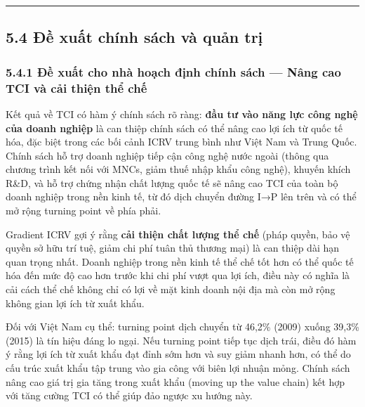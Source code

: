 \documentclass[12pt,a4paper]{article}
\begin{document}
\begin{center}\rule{0.5\linewidth}{0.5pt}\end{center}

\hypertarget{54-ux111ux1ec1-xuux1ea5t-chuxednh-suxe1ch-vuxe0-quux1ea3n-trux1ecb}{%
\subsection{5.4 Đề xuất chính sách và quản
trị}\label{54-ux111ux1ec1-xuux1ea5t-chuxednh-suxe1ch-vuxe0-quux1ea3n-trux1ecb}}

\hypertarget{541-ux111ux1ec1-xuux1ea5t-cho-nhuxe0-houx1ea1ch-ux111ux1ecbnh-chuxednh-suxe1ch--nuxe2ng-cao-tci-vuxe0-cux1ea3i-thiux1ec7n-thux1ec3-chux1ebf}{%
\subsubsection{5.4.1 Đề xuất cho nhà hoạch định chính sách --- Nâng cao
TCI và cải thiện thể
chế}\label{541-ux111ux1ec1-xuux1ea5t-cho-nhuxe0-houx1ea1ch-ux111ux1ecbnh-chuxednh-suxe1ch--nuxe2ng-cao-tci-vuxe0-cux1ea3i-thiux1ec7n-thux1ec3-chux1ebf}}

Kết quả về TCI có hàm ý chính sách rõ ràng: \textbf{đầu tư vào năng lực
công nghệ của doanh nghiệp} là can thiệp chính sách có thể nâng cao lợi
ích từ quốc tế hóa, đặc biệt trong các bối cảnh ICRV trung bình như Việt
Nam và Trung Quốc. Chính sách hỗ trợ doanh nghiệp tiếp cận công nghệ
nước ngoài (thông qua chương trình kết nối với MNCs, giảm thuế nhập khẩu
công nghệ), khuyến khích R\&D, và hỗ trợ chứng nhận chất lượng quốc tế
sẽ nâng cao TCI của toàn bộ doanh nghiệp trong nền kinh tế, từ đó dịch
chuyển đường I→P lên trên và có thể mở rộng turning point về phía phải.

Gradient ICRV gợi ý rằng \textbf{cải thiện chất lượng thể chế} (pháp
quyền, bảo vệ quyền sở hữu trí tuệ, giảm chi phí tuân thủ thương mại) là
can thiệp dài hạn quan trọng nhất. Doanh nghiệp trong nền kinh tế thể
chế tốt hơn có thể quốc tế hóa đến mức độ cao hơn trước khi chi phí vượt
qua lợi ích, điều này có nghĩa là cải cách thể chế không chỉ có lợi về
mặt kinh doanh nội địa mà còn mở rộng không gian lợi ích từ xuất khẩu.

Đối với Việt Nam cụ thể: turning point dịch chuyển từ 46,2\% (2009)
xuống 39,3\% (2015) là tín hiệu đáng lo ngại. Nếu turning point tiếp tục
dịch trái, điều đó hàm ý rằng lợi ích từ xuất khẩu đạt đỉnh sớm hơn và
suy giảm nhanh hơn, có thể do cấu trúc xuất khẩu tập trung vào gia công
với biên lợi nhuận mỏng. Chính sách nâng cao giá trị gia tăng trong xuất
khẩu (moving up the value chain) kết hợp với tăng cường TCI có thể giúp
đảo ngược xu hướng này.
\end{document}
